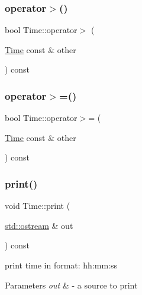 \mbox{\label{classTime_a6d544b6af2fd13223a5436d34964fe3a}} 
\subsubsection{\texorpdfstring{operator$>$()}{operator>()}}
{\footnotesize\ttfamily bool Time\+::operator$>$ (\begin{DoxyParamCaption}\item[{\hyperlink{classTime}{Time} const \&}]{other }\end{DoxyParamCaption}) const}

\mbox{\label{classTime_a1f7d030e8a6095b0bcd41bf4c5db3719}} 
\subsubsection{\texorpdfstring{operator$>$=()}{operator>=()}}
{\footnotesize\ttfamily bool Time\+::operator$>$= (\begin{DoxyParamCaption}\item[{\hyperlink{classTime}{Time} const \&}]{other }\end{DoxyParamCaption}) const}

\mbox{\label{classTime_a2596ef53ebb188dc75b88160bd0aa230}} 
\subsubsection{\texorpdfstring{print()}{print()}}
{\footnotesize\ttfamily void Time\+::print (\begin{DoxyParamCaption}\item[{\hyperlink{doctest_8h_a116af65cb5e924b33ad9d9ecd7a783f3}{std\+::ostream} \&}]{out }\end{DoxyParamCaption}) const}

print time in format\+: hh\+:mm\+:ss 
\begin{DoxyParams}{Parameters}
{\em out} & -\/ a source to print \\
\hline
\end{DoxyParams}
\mbox{\label{classTime_acab7dbc13c8a0d9a0f33047d41f4aee0}} 
